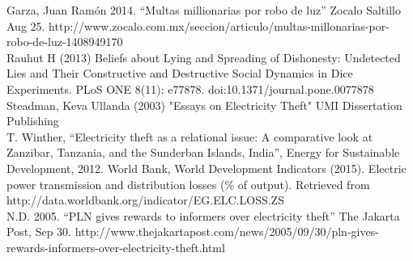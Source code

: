 \documentclass{article}
\begin{document}
Garza, Juan Ramón 2014. “Multas millionarias por robo de luz” Zocalo Saltillo Aug 25. http://www.zocalo.com.mx/seccion/articulo/multas-millonarias-por-robo-de-luz-1408949170\\

Rauhut H (2013) Beliefs about Lying and Spreading of Dishonesty: Undetected Lies and Their Constructive and Destructive Social Dynamics in Dice
Experiments. PLoS ONE 8(11): e77878. doi:10.1371/journal.pone.0077878\\

Steadman, Keva Ullanda (2003) "Essays on Electricity Theft"  UMI Dissertation Publishing\\

T. Winther, “Electricity theft as a relational issue: A comparative look at Zanzibar, Tanzania, and the Sunderban Islands, India”, Energy for Sustainable Development, 2012.
World Bank, World Development Indicators (2015). Electric power transmission and distribution losses (\% of output). Retrieved from http://data.worldbank.org/indicator/EG.ELC.LOSS.ZS\\

N.D. 2005.  “PLN gives rewards to informers over electricity theft” The Jakarta Post, Sep 30. http://www.thejakartapost.com/news/2005/09/30/pln-gives-rewards-informers-over-electricity-theft.html
\end{document}
